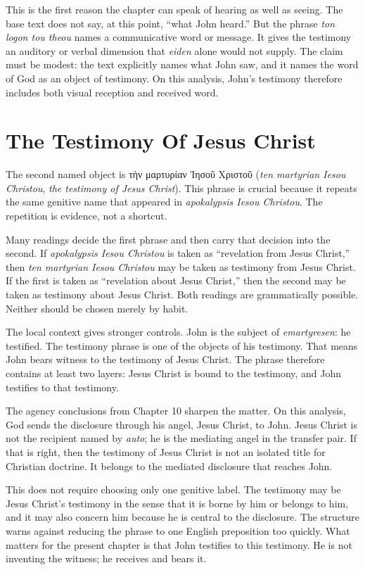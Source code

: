 This is the first reason the chapter can speak of hearing as well as seeing. The base text does not say, at this point, ``what John heard.'' But the phrase \textit{ton logon tou theou} names a communicative word or message. It gives the testimony an auditory or verbal dimension that \textit{eiden} alone would not supply. The claim must be modest: the text explicitly names what John saw, and it names the word of God as an object of testimony. On this analysis, John's testimony therefore includes both visual reception and received word.

\section{The Testimony Of Jesus Christ}

The second named object is \textgreek{τὴν μαρτυρίαν Ἰησοῦ Χριστοῦ} (\textit{ten martyrian Iesou Christou}, \textit{the testimony of Jesus Christ}). This phrase is crucial because it repeats the same genitive name that appeared in \textit{apokalypsis Iesou Christou}. The repetition is evidence, not a shortcut.

Many readings decide the first phrase and then carry that decision into the second. If \textit{apokalypsis Iesou Christou} is taken as ``revelation from Jesus Christ,'' then \textit{ten martyrian Iesou Christou} may be taken as testimony from Jesus Christ. If the first is taken as ``revelation about Jesus Christ,'' then the second may be taken as testimony about Jesus Christ. Both readings are grammatically possible. Neither should be chosen merely by habit.

The local context gives stronger controls. John is the subject of \textit{emartyresen}: he testified. The testimony phrase is one of the objects of his testimony. That means John bears witness to the testimony of Jesus Christ. The phrase therefore contains at least two layers: Jesus Christ is bound to the testimony, and John testifies to that testimony.

The agency conclusions from Chapter 10 sharpen the matter. On this analysis, God sends the disclosure through his angel, Jesus Christ, to John. Jesus Christ is not the recipient named by \textit{auto}; he is the mediating angel in the transfer pair. If that is right, then the testimony of Jesus Christ is not an isolated title for Christian doctrine. It belongs to the mediated disclosure that reaches John.

This does not require choosing only one genitive label. The testimony may be Jesus Christ's testimony in the sense that it is borne by him or belongs to him, and it may also concern him because he is central to the disclosure. The structure warns against reducing the phrase to one English preposition too quickly. What matters for the present chapter is that John testifies to this testimony. He is not inventing the witness; he receives and bears it.

